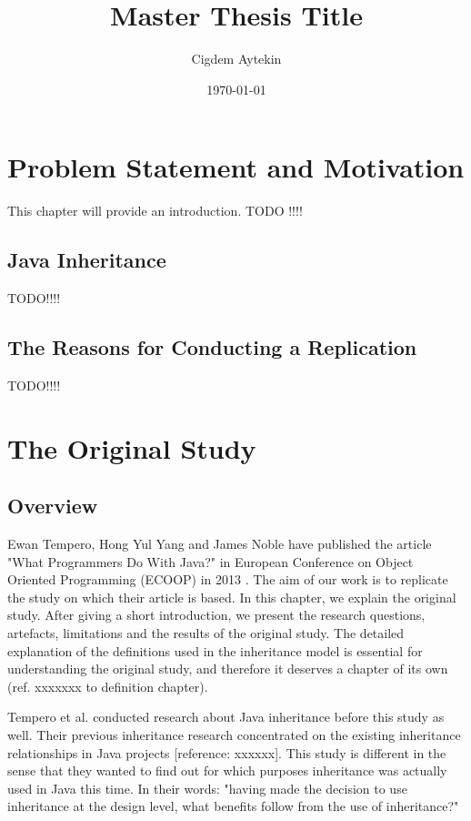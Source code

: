 \documentclass{uvamscse}
\title{Master Thesis Title}
\author{Cigdem Aytekin}
\date{\today}
\begin{document}
\maketitle


\chapter{Problem Statement and Motivation}
This chapter will provide an introduction. TODO !!!!

\section{Java Inheritance}
TODO!!!!

\section{The Reasons for Conducting a Replication}
TODO!!!!


\chapter{The Original Study}
\section{Overview}

Ewan Tempero, Hong Yul Yang and James Noble have published the article "What Programmers Do With Java?" in European Conference on Object Oriented Programming (ECOOP) in 2013 \cite{DBLP:conf/ecoop/TemperoYN13}. The aim of our work is to replicate the study on which their article is based. In this chapter, we explain the original study. After giving a short introduction, we present the research questions, artefacts, limitations and the results of the original study. The detailed explanation of the definitions used in the inheritance model is essential for understanding the original study, and therefore it deserves a chapter of its own (ref. xxxxxxx to definition chapter). 

Tempero et al. conducted research about Java inheritance before this study as well. Their previous inheritance research concentrated on the existing inheritance relationships in Java projects [reference: xxxxxx]. This study is different in the sense that they wanted to find out for which purposes inheritance was actually used in Java this time. In their words: "having made the decision to use inheritance at the design level, what benefits follow from the use of inheritance?" 
\end{document}

